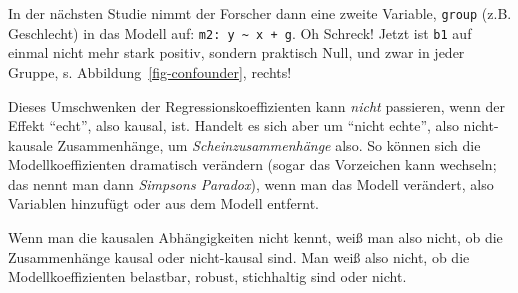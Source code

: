 \documentclass[
  letterpaper,
  twoside,
  open=any]{scrbook}
\theoremstyle{definition}
\theoremstyle{definition}
\theoremstyle{definition}
\theoremstyle{remark}
\begin{document}
In der nächsten Studie nimmt der Forscher dann eine zweite Variable,
\texttt{group} (z.B. Geschlecht) in das Modell auf:
\texttt{m2:\ y\ \textasciitilde{}\ x\ +\ g}. Oh Schreck! Jetzt ist
\texttt{b1} auf einmal nicht mehr stark positiv, sondern praktisch Null,
und zwar in jeder Gruppe, s. Abbildung~\ref{fig-confounder}, rechts!

Dieses Umschwenken der Regressionskoeffizienten kann \emph{nicht}
passieren, wenn der Effekt \enquote{echt}, also kausal, ist. Handelt es
sich aber um \enquote{nicht echte}, also nicht-kausale Zusammenhänge, um
\emph{Scheinzusammenhänge} also. So können sich die Modellkoeffizienten
dramatisch verändern (sogar das Vorzeichen kann wechseln; das nennt man
dann \emph{Simpsons Paradox}), wenn man das Modell verändert, also
Variablen hinzufügt oder aus dem Modell entfernt.

Wenn man die kausalen Abhängigkeiten nicht kennt, weiß man also nicht,
ob die Zusammenhänge kausal oder nicht-kausal sind. Man weiß also nicht,
ob die Modellkoeffizienten belastbar, robust, stichhaltig sind oder
nicht.
\end{document}
